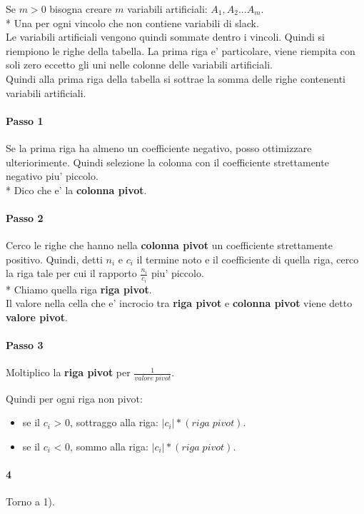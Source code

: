 Se $m > 0$ bisogna creare $m$ variabili artificiali: $A_1, A_2 ... A_m$. \\*
Una per ogni vincolo che non contiene variabili di slack. \\

Le variabili artificiali vengono quindi sommate dentro i vincoli. Quindi si riempiono le righe della tabella. La prima riga e' particolare, viene  riempita con soli zero eccetto gli uni nelle colonne delle variabili artificiali. \\

Quindi alla prima riga della tabella si sottrae la somma delle righe contenenti variabili artificiali. \\

\paragraph{Passo 1}

Se la prima riga ha almeno un coefficiente negativo, posso ottimizzare ulteriorimente.
Quindi selezione la colonna con il coefficiente strettamente negativo piu' piccolo. \\*
Dico che e' la \textbf{colonna pivot}.

\paragraph{Passo 2}

Cerco le righe che hanno nella \textbf{colonna pivot} un coefficiente strettamente positivo.
Quindi, detti $n_i$ e $c_i$ il termine noto e il coefficiente di quella riga, cerco la riga tale per cui il rapporto $\frac {n_i} {c_i}$ piu' piccolo. \\*
Chiamo quella riga \textbf{riga pivot}. \\
Il valore nella cella che e' incrocio tra \textbf{riga pivot} e \textbf{colonna pivot} viene detto \textbf{valore pivot}.

\paragraph{Passo 3}

Moltiplico la \textbf{riga pivot} per $\frac {1} {valore \; pivot}$.

Quindi per ogni riga non pivot:
\begin{itemize}
    \item se il $c_i$ > 0, sottraggo alla riga: $|c_i| * (riga \; pivot)$.
    \item se il $c_i$ < 0, sommo alla riga: $|c_i| * (riga \; pivot)$.
\end{itemize}

\paragraph{4}

Torno a 1).
